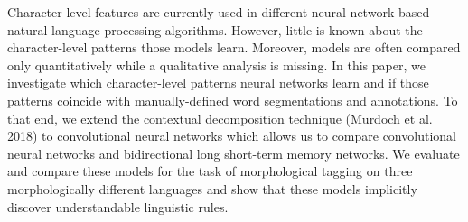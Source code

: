 Character-level features are currently used in different neural network-based natural language processing algorithms. However, little is known about the character-level patterns those models learn. Moreover, models are often compared only quantitatively while a qualitative analysis is missing. In this paper, we investigate which character-level patterns neural networks learn and if those patterns coincide with manually-defined word segmentations and annotations. To that end, we extend the contextual decomposition technique (Murdoch et al. 2018) to convolutional neural networks which allows us to compare convolutional neural networks and bidirectional long short-term memory networks. We evaluate and compare these models for the task of morphological tagging on three morphologically different languages and show that these models implicitly discover understandable linguistic rules.
